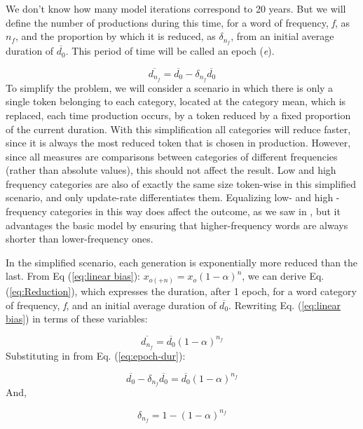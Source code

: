 We don't know how many model iterations correspond to 20 years. But
we will define the number of productions during this time, for a word
of frequency, \emph{f}, as $n_{f}$, and the proportion by which it
is reduced, as $\delta_{n_{f}}$, from an initial average duration
of $\overline{d_{0}}$. This period of time will be called an epoch
(\emph{e}). 

\begin{equation}
\overline{d_{n_{f}}}=\overline{d_{0}}-\delta_{n_{f}}\overline{d_{0}}\label{eq:epoch-dur}
\end{equation}
To simplify the problem, we will consider a scenario in which there
is only a single token belonging to each category, located at the
category mean, which is replaced, each time production occurs, by
a token reduced by a fixed proportion of the current duration. With
this simplification all categories will reduce faster, since it is
always the most reduced token that is chosen in production. However,
since all measures are comparisons between categories of different
frequencies (rather than absolute values), this should not affect
the result. Low and high frequency categories are also of exactly
the same size token-wise in this simplified scenario, and only update-rate
differentiates them. Equalizing low- and high -frequency categories
in this way does affect the outcome, as we saw in ,
but it advantages the basic model by ensuring that higher-frequency
words are always shorter than lower-frequency ones.

In the simplified scenario, each generation is exponentially more
reduced than the last. From Eq (\ref{eq:linear bias}): $x_{o(+n)}=x_{o}\left(1-\alpha\right)^{n}$,
we can derive Eq. (\ref{eq:Reduction}), which expresses the duration,
after 1 epoch, for a word category of frequency, \emph{f}, and an
initial average duration of $\overline{d_{0}}$. Rewriting Eq. (\ref{eq:linear bias})
in terms of these variables:

\begin{equation}
\overline{d_{n_{f}}}=\overline{d_{0}}(1-\alpha)^{n_{f}}
\end{equation}
Substituting in from Eq. (\ref{eq:epoch-dur}):

\begin{equation}
\overline{d_{0}}-\delta_{n_{f}}\overline{d_{0}}=\overline{d_{0}}(1-\alpha)^{n_{f}}
\end{equation}
And, 

\begin{equation}
\delta_{n_{f}}=1-(1-\alpha)^{n_{f}}\label{eq:Reduction}
\end{equation}

